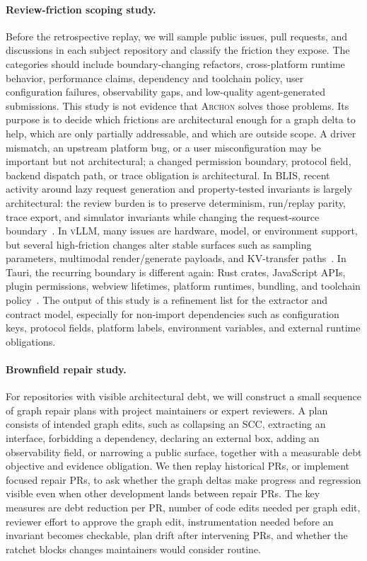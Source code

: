 \documentclass[sigconf,review,anonymous]{acmart}
\theoremstyle{plain}
\theoremstyle{definition}
\begin{document}
\paragraph{Review-friction scoping study.}
Before the retrospective replay, we will sample public issues, pull requests,
and discussions in each subject repository and classify the friction they expose.
The categories should include boundary-changing refactors, cross-platform
runtime behavior, performance claims, dependency and toolchain policy, user
configuration failures, observability gaps, and low-quality agent-generated
submissions. This study is not evidence that \textsc{Archon} solves those problems. Its
purpose is to decide which frictions are architectural enough for a graph delta
to help, which are only partially addressable, and which are outside scope. A
driver mismatch, an upstream platform bug, or a user misconfiguration may be
important but not architectural; a changed permission boundary, protocol field,
backend dispatch path, or trace obligation is architectural. In BLIS, recent
activity around lazy request generation and
property-tested invariants is largely architectural: the review burden is to
preserve determinism, run/replay parity, trace export, and simulator invariants
while changing the request-source boundary~\cite{blislazyrequests,blisrequestsource}.
In \textsc{vLLM}, many issues are hardware, model, or environment support, but
several high-friction changes alter stable surfaces such as sampling parameters,
multimodal render/generate payloads, and KV-transfer paths~\cite{vllmtracereplay,vllmmultimodalrfc}.
In Tauri, the recurring boundary is different again: Rust crates, JavaScript
APIs, plugin permissions, webview lifetimes, platform runtimes, bundling, and
toolchain policy~\cite{taurieventlisteners,taurimsrv}. The output of this study
is a refinement list for the extractor and contract model, especially for
non-import dependencies such as configuration keys, protocol fields, platform
labels, environment variables, and external runtime obligations.

\paragraph{Brownfield repair study.}
For repositories with visible architectural debt, we will construct a small
sequence of graph repair plans with project maintainers or expert reviewers. A
plan consists of intended graph edits, such as collapsing an SCC, extracting an
interface, forbidding a dependency, declaring an external box, adding an
observability field, or narrowing a public surface, together with a measurable
debt objective and evidence obligation. We then replay historical PRs, or
implement focused repair PRs, to ask whether the graph deltas make progress and
regression visible even when other development lands between repair PRs. The key
measures are debt reduction per PR, number of code edits needed per graph edit,
reviewer effort to approve the graph edit, instrumentation needed before an
invariant becomes checkable, plan drift after intervening PRs, and whether the
ratchet blocks changes maintainers would consider routine.
\end{document}
